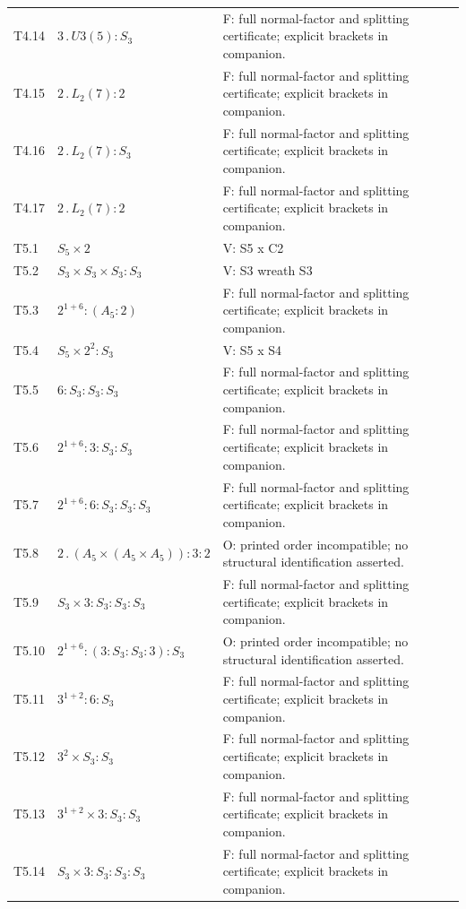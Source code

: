 \begin{longtable}{@{}lp{.40\linewidth}>{\raggedright\arraybackslash}p{.46\linewidth}@{}}
T4.14 & $3 \mathbin{.} U3(5) : S_{3}$ & F: full normal-factor and splitting certificate; explicit brackets in companion.\\
T4.15 & $2 \mathbin{.} L_{2}(7) : 2$ & F: full normal-factor and splitting certificate; explicit brackets in companion.\\
T4.16 & $2 \mathbin{.} L_{2}(7) : S_{3}$ & F: full normal-factor and splitting certificate; explicit brackets in companion.\\
T4.17 & $2 \mathbin{.} L_{2}(7) : 2$ & F: full normal-factor and splitting certificate; explicit brackets in companion.\\
T5.1 & $S_{5} \times 2$ & V: S5 x C2\\
T5.2 & $S_{3} \times S_{3} \times S_{3} : S_{3}$ & V: S3 wreath S3\\
T5.3 & $2^{1+6} : (A_{5} : 2)$ & F: full normal-factor and splitting certificate; explicit brackets in companion.\\
T5.4 & $S_{5} \times 2^2 : S_{3}$ & V: S5 x S4\\
T5.5 & $6 : S_{3} : S_{3} : S_{3}$ & F: full normal-factor and splitting certificate; explicit brackets in companion.\\
T5.6 & $2^{1+6} : 3 : S_{3} : S_{3}$ & F: full normal-factor and splitting certificate; explicit brackets in companion.\\
T5.7 & $2^{1+6} : 6 : S_{3} : S_{3} : S_{3}$ & F: full normal-factor and splitting certificate; explicit brackets in companion.\\
T5.8 & $2 \mathbin{.} (A_{5} \times (A_{5} \times A_{5})) : 3 : 2$ & O: printed order incompatible; no structural identification asserted.\\
T5.9 & $S_{3} \times 3 : S_{3} : S_{3} : S_{3}$ & F: full normal-factor and splitting certificate; explicit brackets in companion.\\
T5.10 & $2^{1+6} : (3 : S_{3} : S_{3} : 3) : S_{3}$ & O: printed order incompatible; no structural identification asserted.\\
T5.11 & $3^{1+2} : 6 : S_{3}$ & F: full normal-factor and splitting certificate; explicit brackets in companion.\\
T5.12 & $3^2 \times S_{3} : S_{3}$ & F: full normal-factor and splitting certificate; explicit brackets in companion.\\
T5.13 & $3^{1+2} \times 3 : S_{3} : S_{3}$ & F: full normal-factor and splitting certificate; explicit brackets in companion.\\
T5.14 & $S_{3} \times 3 : S_{3} : S_{3} : S_{3}$ & F: full normal-factor and splitting certificate; explicit brackets in companion.\\

\end{longtable}
